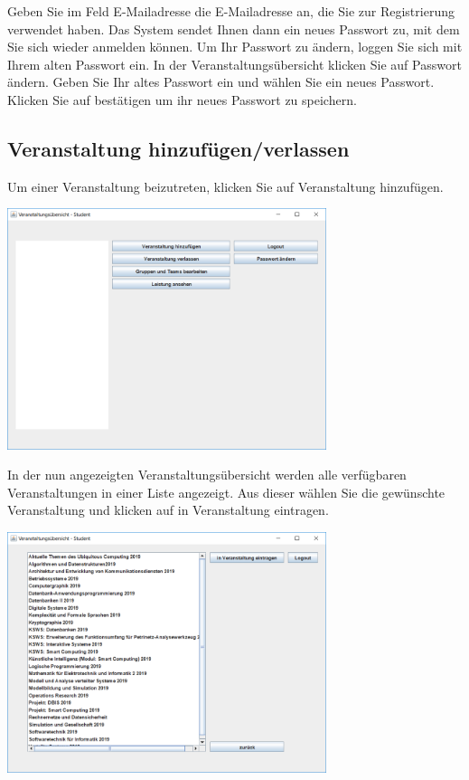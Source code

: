 \documentclass{Handbuch}
\begin{document}
Geben Sie im Feld \glqq E-Mailadresse\grqq{} die E-Mailadresse an, die Sie zur Registrierung verwendet haben. Das System sendet Ihnen dann ein neues Passwort zu, mit dem Sie sich wieder anmelden können. 
Um Ihr Passwort zu ändern, loggen Sie sich mit Ihrem alten Passwort ein. In der Veranstaltungsübersicht klicken Sie auf \frqq Passwort ändern\flqq. Geben Sie Ihr altes Passwort ein und wählen Sie ein neues Passwort. Klicken Sie auf \frqq bestätigen\flqq{} um ihr neues Passwort zu speichern.

\subsection{Veranstaltung hinzufügen/verlassen}
Um einer Veranstaltung beizutreten, klicken Sie auf \frqq Veranstaltung hinzufügen\flqq{}. 
\begin{center}
	\includegraphics[width=0.7\textwidth]{img_student1.png}
\end{center}
In der nun angezeigten Veranstaltungsübersicht werden alle verfügbaren Veranstaltungen in einer Liste angezeigt. Aus dieser wählen Sie die gewünschte Veranstaltung und klicken auf \frqq in Veranstaltung eintragen\flqq{}.
\begin{center}
	\includegraphics[width=0.7\textwidth]{img_student2.png}
\end{center}
\end{document}
